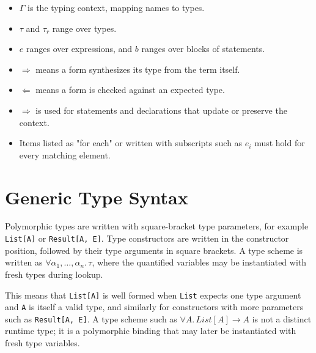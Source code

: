 \documentclass[11pt]{article}
\newcommand{\syn}{\Rightarrow} %
\newcommand{\chk}{\Leftarrow} %
\begin{document}
\begin{itemize}
    \item $\Gamma$ is the typing context, mapping names to types.
    \item $\tau$ and $\tau_r$ range over types.
    \item $e$ ranges over expressions, and $b$ ranges over blocks of statements.
    \item $\syn$ means a form synthesizes its type from the term itself.
    \item $\chk$ means a form is checked against an expected type.
    \item $\Rightarrow$ is used for statements and declarations that update or preserve the context.
    \item Items listed as "for each" or written with subscripts such as $e_i$ must hold for every matching element.
\end{itemize}

\section{Generic Type Syntax}
Polymorphic types are written with square-bracket type parameters, for example \texttt{List[A]} or \texttt{Result[A, E]}. Type constructors are written in the constructor position, followed by their type arguments in square brackets. A type scheme is written as $\forall \alpha_1, \ldots, \alpha_n.\,\tau$, where the quantified variables may be instantiated with fresh types during lookup.


This means that \texttt{List[A]} is well formed when \texttt{List} expects one type argument and \texttt{A} is itself a valid type, and similarly for constructors with more parameters such as \texttt{Result[A, E]}. A type scheme such as $\forall A.\,List[A] \to A$ is not a distinct runtime type; it is a polymorphic binding that may later be instantiated with fresh type variables.
\end{document}
